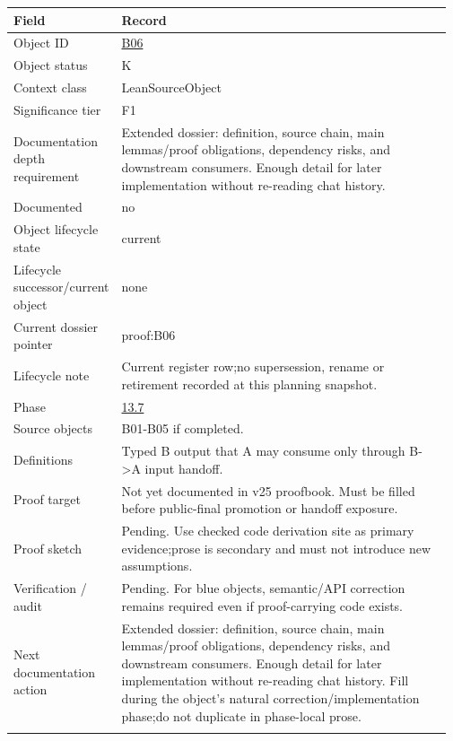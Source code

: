 \begin{longtable}{L{0.16\linewidth} L{0.81\linewidth}}
\hline
\textbf{Field} & \textbf{Record}\\
\hline
Object ID & \hyperlink{object-row-B06}{B06}\\
\hline\addlinespace[0.20em]
Object status & K\\
\hline\addlinespace[0.20em]
Context class & LeanSourceObject\\
\hline\addlinespace[0.20em]
Significance tier & F1\\
\hline\addlinespace[0.20em]
Documentation depth requirement & Extended dossier: definition, source chain, main lemmas/\allowbreak{}proof obligations, dependency risks, and downstream consumers. Enough detail for later implementation without re-reading chat history.\\
\hline\addlinespace[0.20em]
Documented & no\\
\hline\addlinespace[0.20em]
Object lifecycle state & current\\
\hline\addlinespace[0.20em]
Lifecycle successor/\allowbreak{}current object & none\\
\hline\addlinespace[0.20em]
Current dossier pointer & proof:B06\\
\hline\addlinespace[0.20em]
Lifecycle note & Current register row;\newline no supersession, rename or retirement recorded at this planning snapshot.\\
\hline\addlinespace[0.20em]
Phase & \hyperlink{phase-row-13-7}{13.7}\\
\hline\addlinespace[0.20em]
Source objects & B01-B05 if completed.\\
\hline\addlinespace[0.20em]
Definitions & Typed B output that A may consume only through B->A input handoff.\\
\hline\addlinespace[0.20em]
Proof target & Not yet documented in v25 proofbook. Must be filled before public-final promotion or handoff exposure.\\
\hline\addlinespace[0.20em]
Proof sketch & Pending. Use checked code derivation site as primary evidence;\newline prose is secondary and must not introduce new assumptions.\\
\hline\addlinespace[0.20em]
Verification /\allowbreak{} audit & Pending. For blue objects, semantic/\allowbreak{}API correction remains required even if proof-carrying code exists.\\
\hline\addlinespace[0.20em]
Next documentation action & Extended dossier: definition, source chain, main lemmas/\allowbreak{}proof obligations, dependency risks, and downstream consumers. Enough detail for later implementation without re-reading chat history. Fill during the object's natural correction/\allowbreak{}implementation phase;\newline do not duplicate in phase-local prose.\\
\hline\addlinespace[0.20em]
\end{longtable}
